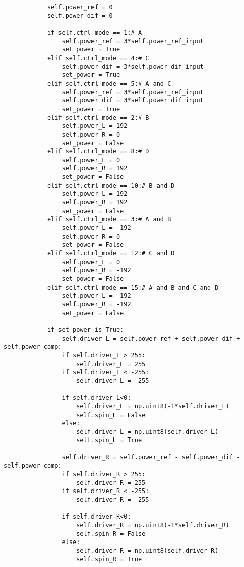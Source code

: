 \begin{lstlisting}
            self.power_ref = 0 
            self.power_dif = 0               

            if self.ctrl_mode == 1:# A
                self.power_ref = 3*self.power_ref_input
                set_power = True
            elif self.ctrl_mode == 4:# C
                self.power_dif = 3*self.power_dif_input
                set_power = True           
            elif self.ctrl_mode == 5:# A and C
                self.power_ref = 3*self.power_ref_input
                self.power_dif = 3*self.power_dif_input
                set_power = True  
            elif self.ctrl_mode == 2:# B
                self.power_L = 192
                self.power_R = 0
                set_power = False 
            elif self.ctrl_mode == 8:# D
                self.power_L = 0
                self.power_R = 192
                set_power = False 
            elif self.ctrl_mode == 10:# B and D
                self.power_L = 192
                self.power_R = 192
                set_power = False
            elif self.ctrl_mode == 3:# A and B
                self.power_L = -192
                self.power_R = 0
                set_power = False 
            elif self.ctrl_mode == 12:# C and D
                self.power_L = 0
                self.power_R = -192
                set_power = False  
            elif self.ctrl_mode == 15:# A and B and C and D
                self.power_L = -192
                self.power_R = -192
                set_power = False 

            if set_power is True:
                self.driver_L = self.power_ref + self.power_dif + self.power_comp:
                if self.driver_L > 255:
                    self.driver_L = 255
                if self.driver_L < -255:
                    self.driver_L = -255

                if self.driver_L<0:
                    self.driver_L = np.uint8(-1*self.driver_L)
                    self.spin_L = False
                else:
                    self.driver_L = np.uint8(self.driver_L)
                    self.spin_L = True

                self.driver_R = self.power_ref - self.power_dif - self.power_comp:
                if self.driver_R > 255:
                    self.driver_R = 255
                if self.driver_R < -255:
                    self.driver_R = -255

                if self.driver_R<0:
                    self.driver_R = np.uint8(-1*self.driver_R)
                    self.spin_R = False
                else:
                    self.driver_R = np.uint8(self.driver_R)
                    self.spin_R = True


\end{lstlisting}
